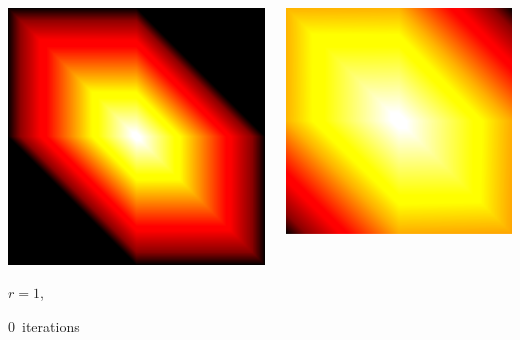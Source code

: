 \documentclass[aspectratio=169,t]{beamer}
\begin{document}
{\begin{columns}
\begin{column}{0.22\textwidth}
			\centering
			\includegraphics[width=.85\textwidth]{data/synthetic_meshes/square_tesselation_2tri_Dirac_delta_1_v9_f8_funcvals_0iter_crop.png}
			{\footnotesize
				\par \vspace{-1mm} $r=1$,
				\par \vspace{-1mm} $0$~iterations
			}
		\end{column}
		\begin{column}{0.22\textwidth}
			\centering
			\includegraphics[width=.85\textwidth]{data/synthetic_meshes/square_tesselation_2tri_Dirac_delta_1_v9_f8_funcvals_1iter_crop.png}

\end{column}
\end{columns}}
\end{document}
